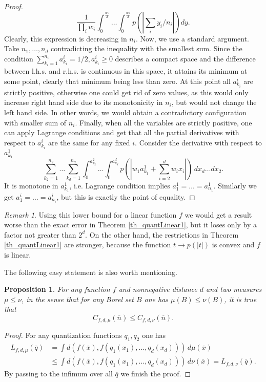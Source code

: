 \documentclass{amsart}
\newtheorem{proposition}[theorem]{Proposition}
\theoremstyle{remark}
\newtheorem{remark}[theorem]{Remark}
\numberwithin{equation}{section}
\numberwithin{figure}{section}
\def\v{\overline}
\begin{document}
\begin{proof}
\[
\frac{1}{\prod_i w_i} \int_0^{\frac{w_1}{2}}\ldots \int_0^{\frac{w_d}{2}} p(|\sum_i y_i/n_i|) dy.
\]
Clearly, this expression is decreasing in $n_i$. Now, we use a standard argument. Take $n_1, \ldots, n_d$ contradicting the inequality with the smallest sum. Since the condition $\sum_{k_i=1}^{n_i} a_{k_i}^i = 1/2, a_{k_i}^i \geq 0$ describes a compact space and the difference between l.h.s. and r.h.s. is continuous in this space, it attains its minimum at some point, clearly that minimum being less than zero. At this point all $a_{k_i}^i$ are strictly positive, otherwise one could get rid of zero values, as this would only increase right hand side due to its monotonicity in $n_i$, but would not change the left hand side. In other words, we would obtain a contradictory configuration with smaller sum of $n_i$. Finally, when all the variables are strictly positive, one can apply Lagrange conditions and get that all the partial derivatives with respect to $a_{k_i}^i$ are the same for any fixed $i$.
	Consider the derivative with respect to $a_{k_1}^1$
	\[
	\sum_{k_2 = 1}^{n_2} \ldots \sum_{k_d=1}^{n_d} \int_0^{a_{k_2}^2} \ldots \int_0^{a_{k_d}^d} p(|w_1a_{k_1}^1 + \sum_{i=2}^d w_i x_i|)\, dx_d\ldots dx_2.
	\]
	It is monotone in $a_{k_1}^1$, i.e. Lagrange condition implies $a_{1}^1 = \ldots = a_{n_1}^1$. Similarly we get $a_{1}^i = \ldots = a_{n_i}^i$, but this is exactly the point of equality. 

\end{proof}

\begin{remark}
	Using this lower bound for a linear function $f$ we would get a result worse than the exact error in Theorem \ref{th_quantLinear1}, but it loses only by a factor not greater than $2^d$. On the other hand, the restrictions in Theorem \ref{th_quantLinear1} are stronger, because the function $t \to p(|t|)$ is convex and $f$ is linear.
\end{remark}



The following easy statement is also worth mentioning.

\begin{proposition}
	\label{prop_measDominance}
	For any function $f$ and nonnegative distance $d$ and two measures $\mu \leq \nu$, in the sense that for any Borel set $B$ one has $\mu(B)\leq \nu(B)$, it is true that
	\[
	C_{f, d, \mu} (\v n) \leq C_{f, d, \nu} (\v n).
	\]
\end{proposition}	

\begin{proof}
	For any quantization functions $q_1, q_2$ one has
	\begin{align*}
	L_{f, d, \mu} (\v q) &= \int d(f(\v x), f(q_1(x_1), \ldots, q_d(x_d))) \,d \mu(\v x)
	\\ &\leq \int d(f(\v x), f(q_1(x_1), \ldots, q_d(x_d))) \,d \nu(\v x) =
	L_{f, d, \nu} (\v q).
	\end{align*}
	By passing to the infimum over all $\v q$ we finish the proof.
\end{proof}
\end{document}
